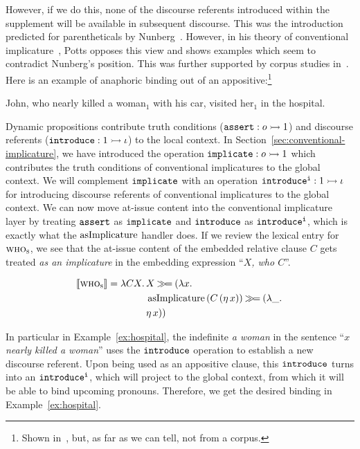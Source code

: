 However, if we do this, none of the discourse referents introduced within
the supplement will be available in subsequent discourse. This was the
introduction predicted for parentheticals by
Nunberg~\cite{nunberg1990linguistics}. However, in his theory of
conventional implicature~\cite{potts2005logic}, Potts opposes this view and
shows examples which seem to contradict Nunberg's position. This was
further supported by corpus studies in~\cite{anderbois2010crossing}. Here
is an example of anaphoric binding out of an appositive:\footnote{Shown
  in~\cite{anderbois2010crossing}, but, as far as we can tell, not from a
  corpus.}

\begin{exe}
  \ex John, who nearly killed a woman$_1$ with his car, visited her$_1$ in
  the hospital. \label{ex:hospital}
\end{exe}

Dynamic propositions contribute truth conditions ($\mathtt{assert} : o \rightarrowtail 1$)
and discourse referents ($\mathtt{introduce} : 1 \rightarrowtail \iota$) to the local
context. In Section~\ref{sec:conventional-implicature}, we have introduced
the operation $\mathtt{implicate} : o \rightarrowtail 1$ which contributes the truth
conditions of conventional implicatures to the global context. We will
complement $\mathtt{implicate}$ with an operation
$\mathtt{introduce^i} : 1 \rightarrowtail \iota$ for introducing discourse referents of
conventional implicatures to the global context. We can now move at-issue
content into the conventional implicature layer by treating $\mathtt{assert}$
as $\mathtt{implicate}$ and $\mathtt{introduce}$ as $\mathtt{introduce^i}$, which is
exactly what the $\operatorname{asImplicature}$ handler does. If we review the lexical
entry for $\textsc{who}_{\textsc{s}}$, we see that the at-issue content of the
embedded relative clause $C$ gets treated \emph{as an implicature} in the
embedding expression ``\emph{$X$, who $C$}''.

$$
\llbracket \textsc{who}_{\textsc{s}} \rrbracket = \lambda C X.\, \begin{aligned}[t]
    &X \mathbin{\gg\!=} (\lambda x.\,  \\
    &\operatorname{asImplicature}\,(C\,(\eta\,x)) \mathbin{\gg\!=} (\lambda \_.\,  \\
    &\eta\,x))
  \end{aligned}
$$

In particular in Example~\ref{ex:hospital}, the indefinite \emph{a woman}
in the sentence ``\emph{$x$ nearly killed a woman}'' uses the
$\mathtt{introduce}$ operation to establish a new discourse referent. Upon
being used as an appositive clause, this $\mathtt{introduce}$ turns into an
$\mathtt{introduce^i}$, which will project to the global context, from which it
will be able to bind upcoming pronouns. Therefore, we get the desired
binding in Example~\ref{ex:hospital}.

